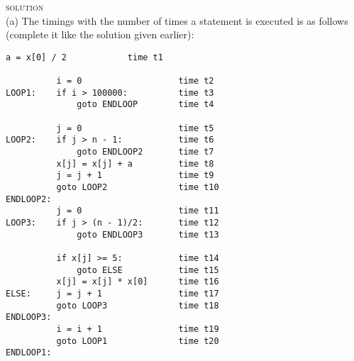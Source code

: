 
\newpage
\textsc{solution}\\
(a)
The timings with the number of times a statement is executed
is as follows (complete it like the solution given earlier):
\begin{Verbatim}[frame=single]
          a = x[0] / 2            time t1

          i = 0                   time t2           
LOOP1:    if i > 100000:          time t3
              goto ENDLOOP        time t4

          j = 0                   time t5
LOOP2:    if j > n - 1:           time t6
              goto ENDLOOP2       time t7
          x[j] = x[j] + a         time t8
          j = j + 1               time t9
          goto LOOP2              time t10
ENDLOOP2:
          j = 0                   time t11
LOOP3:    if j > (n - 1)/2:       time t12
              goto ENDLOOP3       time t13

          if x[j] >= 5:           time t14
              goto ELSE           time t15
          x[j] = x[j] * x[0]      time t16
ELSE:     j = j + 1               time t17
          goto LOOP3              time t18
ENDLOOP3:
          i = i + 1               time t19
          goto LOOP1              time t20
ENDLOOP1:
\end{Verbatim}

